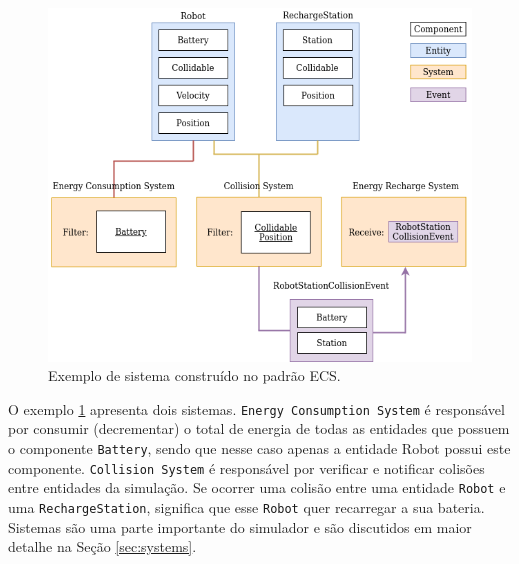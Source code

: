 \begin{figure}
    \centering
    \includegraphics[width=\textwidth]{imagens/ecs.png}
    \caption{Exemplo de sistema construído no padrão ECS.} 
    \label{fig:ecs}
\end{figure}

O exemplo \ref{fig:ecs} apresenta dois sistemas. \texttt{Energy Consumption System} é responsável por consumir (decrementar) o total de energia de todas as entidades que possuem o componente \texttt{Battery}, sendo que nesse caso apenas a entidade Robot possui este componente. \texttt{Collision System} é responsável por verificar e notificar colisões entre entidades da simulação. Se ocorrer uma colisão entre uma entidade \texttt{Robot} e uma \texttt{RechargeStation}, significa que esse \texttt{Robot} quer recarregar a sua bateria. Sistemas são uma parte importante do simulador e são discutidos em maior detalhe na Seção \ref{sec:systems}.


